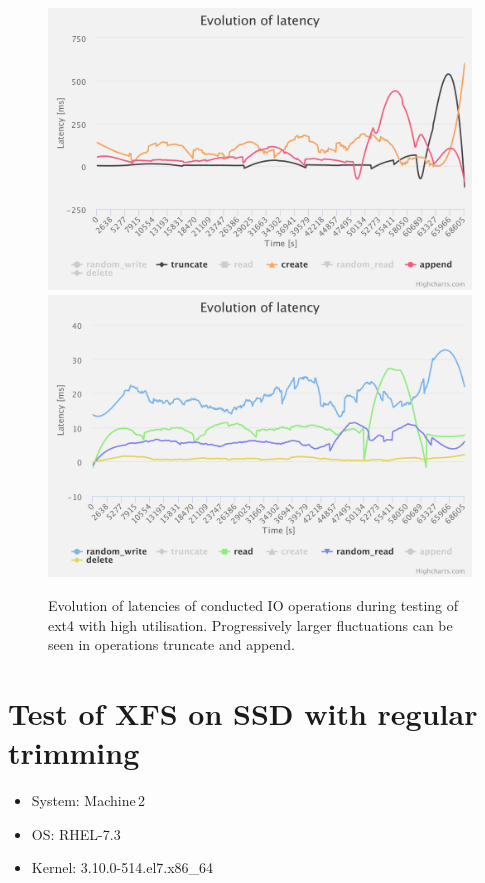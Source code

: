 \documentclass[
  color, %
  table, %
  lof,   %
  lot,   %
]{fithesis3}
\begin{document}
\begin{figure}[!htb]
    \centering
   \begin{minipage}{\textwidth}
        \centering
        \includegraphics[width=\textwidth]{../charts/HDD_ext4/cta}
        \includegraphics[width=\textwidth]{../charts/HDD_ext4/rrrd}
                \caption[Evolution of latencies of ext4 during testing of high utilisation of HDD]{Evolution of latencies of conducted IO operations during testing of ext4 with high utilisation. Progressively larger fluctuations can be seen in operations truncate and append.}
\label{fig:lats_ext4}
    \end{minipage}
\end{figure}

\clearpage



\section{Test of XFS on SSD with regular trimming}
\begin{itemize}
\itemsep0em 
   \item System: Machine\,2
   \item OS: RHEL-7.3
   \item Kernel: 3.10.0-514.el7.x86\_64
\end{itemize}
\end{document}
